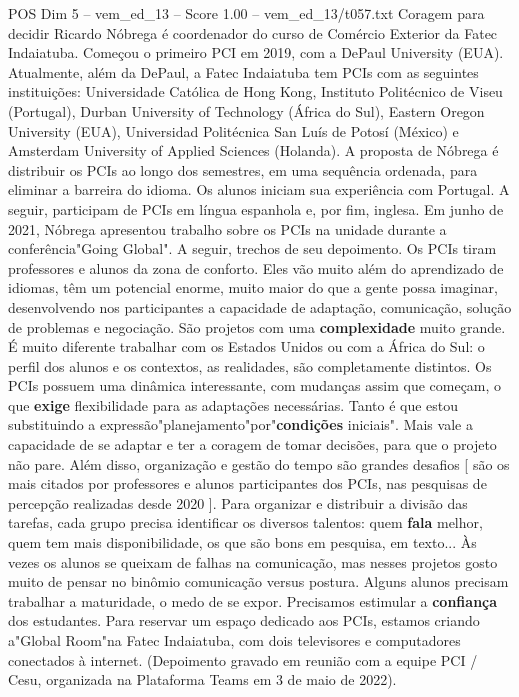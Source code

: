 \begin{textsample}{POS Dim 5 – vem\_ed\_13 – Score 1.00 – vem\_ed\_13/t057.txt}  \label{ex:f5_pos_162}
Coragem para decidir Ricardo Nóbrega é coordenador do curso de Comércio Exterior da Fatec Indaiatuba.
Começou o primeiro PCI em 2019, com a DePaul University (EUA).
Atualmente, além da DePaul, a Fatec Indaiatuba tem PCIs com as seguintes instituições: Universidade Católica de Hong Kong, Instituto Politécnico de Viseu (Portugal), Durban University of Technology (África do Sul), Eastern Oregon University (EUA), Universidad Politécnica San Luís de Potosí (México) e Amsterdam University of Applied Sciences (Holanda).
A proposta de Nóbrega é distribuir os PCIs ao longo dos semestres, em uma sequência ordenada, para eliminar a barreira do idioma.
Os alunos iniciam sua experiência com Portugal.
A seguir, participam de PCIs em língua espanhola e, por fim, inglesa.
Em junho de 2021, Nóbrega apresentou trabalho sobre os PCIs na unidade durante a conferência"Going Global".
A seguir, trechos de seu depoimento.
Os PCIs tiram professores e alunos da zona de conforto.
Eles vão muito além do aprendizado de idiomas, têm um potencial enorme, muito maior do que a gente possa imaginar, desenvolvendo nos participantes a capacidade de adaptação, comunicação, solução de problemas e negociação.
São projetos com uma \textbf{complexidade} muito grande.
É muito diferente trabalhar com os Estados Unidos ou com a África do Sul: o perfil dos alunos e os contextos, as realidades, são completamente distintos.
Os PCIs possuem uma dinâmica interessante, com mudanças assim que começam, o que \textbf{exige} flexibilidade para as adaptações necessárias.
Tanto é que estou substituindo a expressão"planejamento"por"\textbf{condições} iniciais".
Mais vale a capacidade de se adaptar e ter a coragem de tomar decisões, para que o projeto não pare.
Além disso, organização e gestão do tempo são grandes desafios [ são os mais citados por professores e alunos participantes dos PCIs, nas pesquisas de percepção realizadas desde 2020 ].
Para organizar e distribuir a divisão das tarefas, cada grupo precisa identificar os diversos talentos: quem \textbf{fala} melhor, quem tem mais disponibilidade, os que são bons em pesquisa, em texto... Às vezes os alunos se queixam de falhas na comunicação, mas nesses projetos gosto muito de pensar no binômio comunicação versus postura.
Alguns alunos precisam trabalhar a maturidade, o medo de se expor.
Precisamos estimular a \textbf{confiança} dos estudantes.
Para reservar um espaço dedicado aos PCIs, estamos criando a"Global Room"na Fatec Indaiatuba, com dois televisores e computadores conectados à internet. (Depoimento gravado em reunião com a equipe PCI / Cesu, organizada na Plataforma Teams em 3 de maio de 2022).

\end{textsample}

